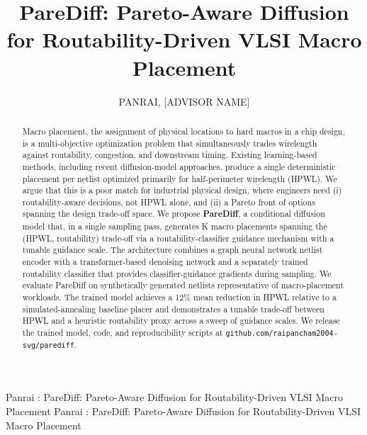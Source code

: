 \documentclass{ieeeaccess}
\begin{document}

\title{PareDiff: Pareto-Aware Diffusion for Routability-Driven VLSI Macro Placement}
\author{\uppercase{Panrai},
\uppercase{[Advisor Name]}}
\address[1]{Department of Electronics and Communication Engineering,
[College Name], India (e-mail: raipancham2004@gmail.com)}

\markboth
{Panrai \headeretal: PareDiff: Pareto-Aware Diffusion for Routability-Driven VLSI Macro Placement}
{Panrai \headeretal: PareDiff: Pareto-Aware Diffusion for Routability-Driven VLSI Macro Placement}


\begin{abstract}
Macro placement, the assignment of physical locations to hard macros in a chip design, is a multi-objective optimization problem that simultaneously trades wirelength against routability, congestion, and downstream timing. Existing learning-based methods, including recent diffusion-model approaches, produce a single deterministic placement per netlist optimized primarily for half-perimeter wirelength (HPWL). We argue that this is a poor match for industrial physical design, where engineers need (i) routability-aware decisions, not HPWL alone, and (ii) a Pareto front of options spanning the design trade-off space. We propose \textbf{PareDiff}, a conditional diffusion model that, in a single sampling pass, generates K macro placements spanning the (HPWL, routability) trade-off via a routability-classifier guidance mechanism with a tunable guidance scale. The architecture combines a graph neural network netlist encoder with a transformer-based denoising network and a separately trained routability classifier that provides classifier-guidance gradients during sampling. We evaluate PareDiff on synthetically generated netlists representative of macro-placement workloads. The trained model achieves a 12\% mean reduction in HPWL relative to a simulated-annealing baseline placer and demonstrates a tunable trade-off between HPWL and a heuristic routability proxy across a sweep of guidance scales. We release the trained model, code, and reproducibility scripts at \texttt{github.com/raipancham2004-svg/parediff}.
\end{abstract}
\end{document}
